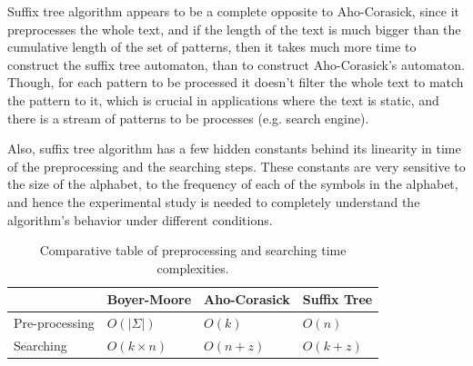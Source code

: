 \documentclass[paper=a4, fontsize=11pt]{scrartcl} %
\numberwithin{equation}{section} %
\numberwithin{figure}{section} %
\numberwithin{table}{section} %
\begin{document}
Suffix tree algorithm appears to be a complete opposite to Aho-Corasick, since it preprocesses the whole text, and if the length of the text is much bigger than the cumulative length of the set of patterns, then it takes much more time to construct the suffix tree automaton, than to construct Aho-Corasick's automaton. Though, for each pattern to be processed it doesn't filter the whole text to match the pattern to it, which is crucial in applications where the text is static, and there is a stream of patterns to be processes (e.g. search engine).

Also, suffix tree algorithm has a few hidden constants behind its linearity in time of the preprocessing and the searching steps. These constants are very sensitive to the size of the alphabet, to the frequency of each of the symbols in the alphabet, and hence the experimental study is needed to completely understand the algorithm's behavior under different conditions.

\begin{table}[h!]
\centering
\begin{tabular}{| l | l | l | l |}
	\hline
	& Boyer-Moore & Aho-Corasick & Suffix Tree \\
	\hline
	Pre-processing & $O(|\Sigma|)$ & $O(k)$ & $O(n)$ \\
	\hline
	Searching & $O(k\times n)$ & $O(n + z)$ & $O(k + z)$ \\
	\hline
\end{tabular}
\caption{Comparative table of preprocessing and searching time complexities.}
\end{table}


\newpage

\end{document}
